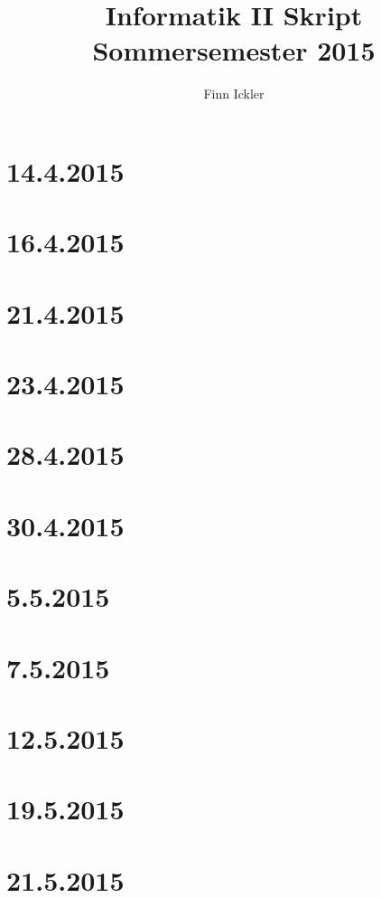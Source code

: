 \documentclass[a4paper,12pt]{scrartcl}
\author{Finn Ickler}
\title{Informatik II Skript Sommersemester 2015}
\begin{document}
\maketitle
\tableofcontents
\newpage
\section{14.4.2015}

\section{16.4.2015}

\section{21.4.2015}

\section{23.4.2015}

\section{28.4.2015}

\section{30.4.2015}

\section{5.5.2015}
\newpage
\section{7.5.2015}

\section{12.5.2015}

\section{19.5.2015}

\section{21.5.2015}

\end{document}
